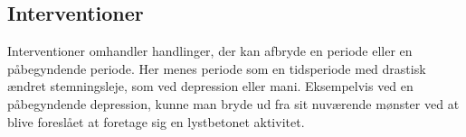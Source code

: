 \subsection{Interventioner}
Interventioner omhandler handlinger, der kan afbryde en periode eller en påbegyndende periode.
Her menes periode som en tidsperiode med drastisk ændret stemningsleje, som ved depression eller mani.
Eksempelvis ved en påbegyndende depression, kunne man bryde ud fra sit nuværende mønster ved at blive foreslået at foretage sig en lystbetonet aktivitet.
